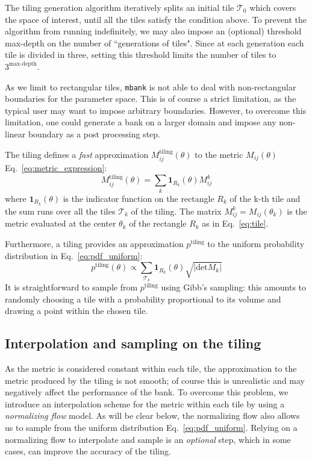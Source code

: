 \documentclass[twocolumn,showpacs,preprintnumbers,nofootinbib,prd,
superscriptaddress,10pt]{revtex4-2}
\begin{document}
The tiling generation algorithm iteratively splits an initial tile $\mathcal{T}_{0}$ which covers the space of interest, until all the tiles satisfy the condition above.
To prevent the algorithm from running indefinitely, we may also impose an (optional) threshold max-depth on the number of ``generations of tiles". Since at each generation each tile is divided in three, setting this threshold limits the number of tiles to $3^{\textrm{max-depth}}$.

As we limit to rectangular tiles, \texttt{mbank} is not able to deal with non-rectangular boundaries for the parameter space. This is of course a strict limitation, as the typical user may want to impose arbitrary boundaries. However, to overcome this limitation, one could generate a bank on a larger domain and impose any non-linear boundary as a post processing step.

The tiling defines a {\it fast} approximation $M^{\text{tiling}}_{ij}(\theta)$ to the metric $M_{ij}(\theta)$ Eq.~\eqref{eq:metric_expression}:
\begin{equation}\label{eq:metric_tiling}
	M^\text{tiling}_{ij}(\theta) = \sum_{k} \mathbf{1}_{R_k}(\theta) M^{k}_{ij}
\end{equation}
where $\mathbf{1}_{R_k}(\theta)$ is the indicator function on the rectangle $R_k$ of the k-th tile and the sum runs over all the tiles $\mathcal{T}_k$ of the tiling. The matrix $M^{k}_{ij} = M_{ij}(\theta_k)$ is the metric evaluated at the center $\theta_k$ of the rectangle $R_k$ as in Eq.~\eqref{eq:tile}.

Furthermore, a tiling provides an approximation $p^{\text{tiling}}$ to the uniform probability distribution in Eq.~\eqref{eq:pdf_uniform}:
\begin{equation}\label{eq:tiling_pdf}
	p^{\text{tiling}}(\theta) \propto \sum_{\mathcal{T}_k} \mathbf{1}_{R_k}(\theta) \sqrt{|\text{det} M_k|}
\end{equation}
It is straightforward to sample from $p^{\text{tiling}}$ using Gibb's sampling: this amounts to randomly choosing a tile with a probability proportional to its volume and drawing a point within the chosen tile.

\subsection{Interpolation and sampling on the tiling} \label{sec:normalizing_flow}

As the metric is considered constant within each tile, the approximation to the metric produced by the tiling is not smooth; of course this is unrealistic and may negatively affect the performance of the bank. To overcome this problem, we introduce an interpolation scheme for the metric within each tile by using a {\it normalizing flow} model. As will be clear below, the normalizing flow also allows us to sample from the uniform distribution Eq.~\eqref{eq:pdf_uniform}.
Relying on a normalizing flow to interpolate and sample is an {\it optional} step, which in some cases, can improve the accuracy of the tiling. 
\end{document}
